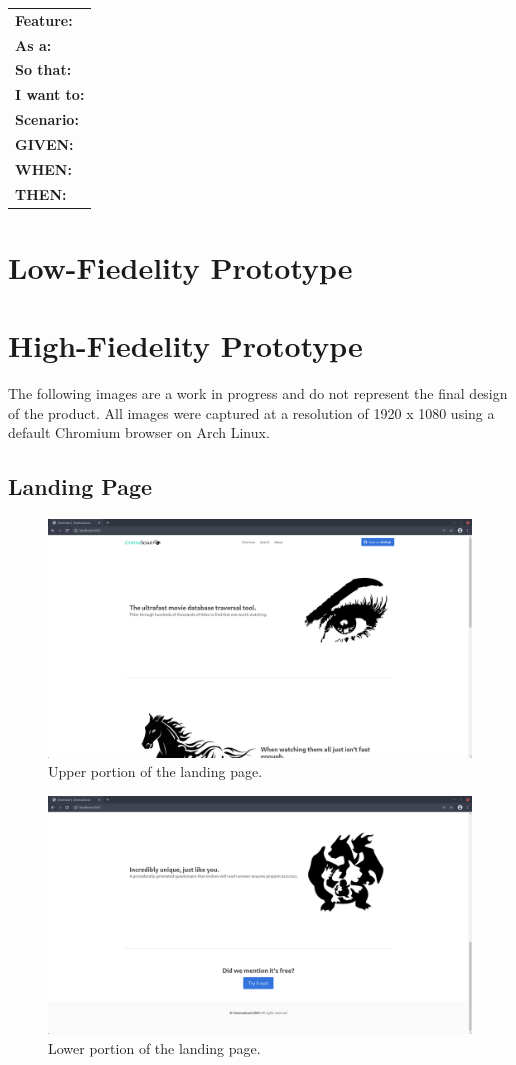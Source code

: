 \documentclass{article}
\begin{document}
\begin{table}[h]
\begin{tabular}{|l|}
\hline
\textbf{Feature:} \\
\textbf{As a:} \\
\textbf{So that:} \\
\textbf{I want to:} \\
\textbf{Scenario:} \\
\textbf{GIVEN:} \\
\textbf{WHEN:} \\
\textbf{THEN:} \\
\hline
\end{tabular}
\end{table}
\section{Low-Fiedelity Prototype}

\section{High-Fiedelity Prototype}
The following images are a work in progress and do not represent the final
design of the product. All images were captured at a resolution of 1920 x
1080 using a default Chromium browser on Arch Linux.
\subsection{Landing Page}
\begin{figure}[H]
\includegraphics[width=\columnwidth]{res/landing_1.png}
\caption{Upper portion of the landing page.}
\end{figure}
\begin{figure}[H]
\includegraphics[width=\columnwidth]{res/landing_2.png}
\caption{Lower portion of the landing page.}
\end{figure}
\end{document}
